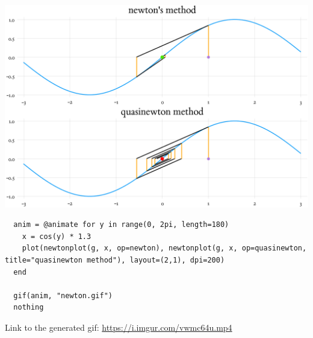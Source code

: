 \documentclass[nobib]{tufte-handout}
\begin{document}
\includegraphics[width=.9\linewidth]{./comparison.png}

\begin{verbatim}
  anim = @animate for y in range(0, 2pi, length=180)
    x = cos(y) * 1.3
    plot(newtonplot(g, x, op=newton), newtonplot(g, x, op=quasinewton, title="quasinewton method"), layout=(2,1), dpi=200)
  end

  gif(anim, "newton.gif")
  nothing
\end{verbatim}

Link to the generated gif: \url{https://i.imgur.com/vwmc64u.mp4}
\end{document}
